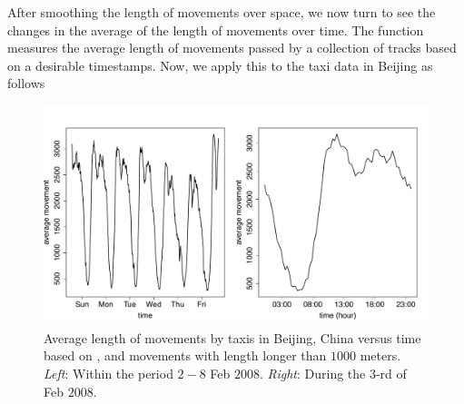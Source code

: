 \documentclass[article]{jss}
\begin{document}
 After smoothing the length of movements over space, we now turn to see the changes in the average of the length of movements over time. The function  measures the average length of movements passed by a collection of tracks based on a desirable timestamps. Now, we apply this to the taxi data in Beijing as follows
\begin{figure}[!h]
\begin{center}
\includegraphics{article-018}
\end{center}
\caption{Average length of movements by taxis in Beijing, China versus time based on , and movements with length longer than $1000$ meters. \emph{Left}: Within the period $2-8$ Feb $2008$. \emph{Right}: During the $3$-rd of Feb $2008$.}
\label{avemovebijing}
\end{figure}
\end{document}
